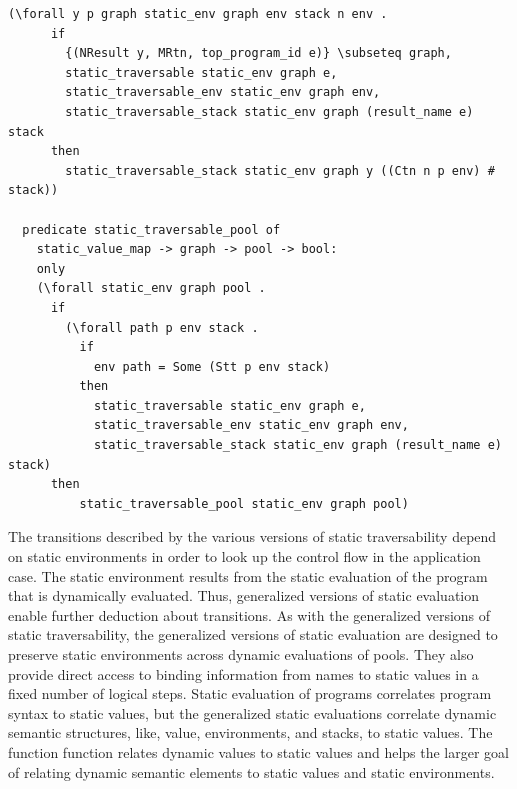 \documentclass[10pt]{article}
\begin{document}
\begin{lstlisting}[language=logic, mathescape]
    (\forall y p graph static_env graph env stack n env .
      if 
        {(NResult y, MRtn, top_program_id e)} \subseteq graph,
        static_traversable static_env graph e,
        static_traversable_env static_env graph env,
        static_traversable_stack static_env graph (result_name e) stack 
      then 
        static_traversable_stack static_env graph y ((Ctn n p env) # stack))

  predicate static_traversable_pool of
    static_value_map -> graph -> pool -> bool:
    only
    (\forall static_env graph pool .
      if
        (\forall path p env stack .
          if
            env path = Some (Stt p env stack)
          then 
            static_traversable static_env graph e, 
            static_traversable_env static_env graph env, 
            static_traversable_stack static_env graph (result_name e) stack) 
      then
          static_traversable_pool static_env graph pool)
  \end{lstlisting}

The transitions described by the various versions of static traversability depend on static
environments in order to look up the control flow in the application case.
The static environment
results from the static evaluation of the program that is dynamically evaluated. Thus,
generalized
versions of static evaluation enable further deduction about transitions.
As with the generalized versions of static traversability,
the generalized versions of static evaluation are designed to
preserve static environments across
dynamic evaluations of pools. They also provide direct access to binding information from names
to static values in a fixed number of logical steps. Static evaluation of programs correlates
program syntax to static values, but the generalized static evaluations correlate dynamic
semantic structures, like, value, environments, and stacks, to static values. The function
function relates dynamic values to static values and helps the larger goal of relating dynamic
semantic elements to static values and static environments.    
\end{document}
